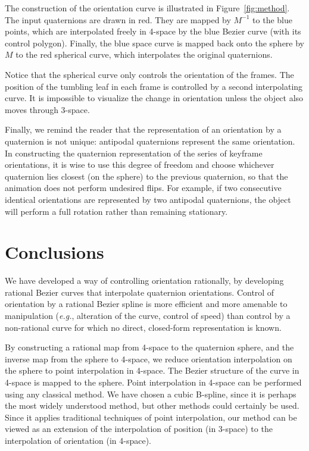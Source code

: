 The construction of the orientation curve is illustrated in
Figure~\ref{fig:method}.
The input quaternions are drawn in red.
They are mapped by $M^{-1}$ to the blue points, which are interpolated
freely in 4-space by the blue Bezier curve (with its control polygon).
Finally, the blue space curve is mapped back onto the sphere by $M$
to the red spherical curve, which interpolates the original quaternions.

Notice that the spherical curve only controls the orientation of the frames.
The position of the tumbling leaf in
each frame is controlled by a second interpolating curve.
It is impossible to visualize the change in orientation unless
the object also moves through 3-space.

Finally, we remind the reader that the representation of an orientation
by a quaternion is not unique: antipodal quaternions represent the same
orientation. 
In constructing the quaternion representation of the
series of keyframe orientations, 
it is wise to use this degree of freedom and 
choose whichever quaternion lies closest (on the sphere)
to the previous quaternion, so that the animation does not perform
undesired flips.
For example, if two consecutive identical orientations are 
represented by two antipodal quaternions, 
the object will perform a full rotation rather than remaining stationary.


\section{Conclusions}
\label{sec:finito}

We have developed a way of controlling orientation rationally,
by developing rational Bezier curves that interpolate quaternion orientations.
Control of orientation by a rational Bezier spline is more efficient
and more amenable to manipulation ({\em e.g.}, alteration of the curve, control
of speed) than control by a non-rational curve 
for which no direct, closed-form representation is known.

By constructing a rational map from 4-space to the quaternion sphere,
and the inverse map from the sphere to 4-space,
we reduce orientation interpolation on the sphere 
to point interpolation in 4-space.
The Bezier structure of the curve in 4-space is mapped to the sphere.
Point interpolation in 4-space can be performed using any
classical method.
We have chosen a cubic B-spline,
since it is perhaps the most widely understood method,
but other methods could certainly be used.
Since it applies traditional techniques of point interpolation,
our method can be viewed as an extension of the interpolation of position
(in 3-space) to the interpolation of orientation (in 4-space).


